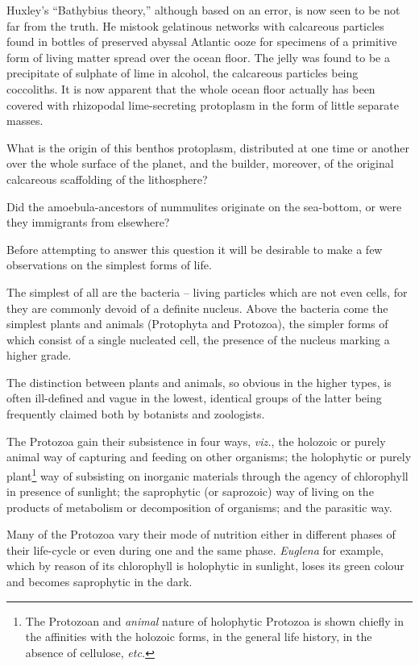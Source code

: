 \documentclass[a4paper, 12pt, oneside]{article}
\begin{document}
Huxley's ``Bathybius theory,'' although based on an error, is now seen to be not far from the truth. He mistook gelatinous networks with calcareous particles found in bottles of preserved abyssal Atlantic ooze for specimens of a primitive form of living matter spread over the ocean floor. The jelly was found to be a precipitate of sulphate of lime in alcohol, the calcareous particles being coccoliths. It is now apparent that the whole ocean floor actually has been covered with rhizopodal lime-secreting protoplasm in the form of little separate masses.

What is the origin of this benthos protoplasm, distributed at one time or another over the whole surface of the planet, and the builder, moreover, of the original calcareous scaffolding of the lithosphere?

Did the amoebula-ancestors of nummulites originate on the sea-bottom, or were they immigrants from elsewhere?

Before attempting to answer this question it will be desirable to make a few observations on the simplest forms of life.

The simplest of all are the bacteria -- living particles which are not even cells, for they are commonly devoid of a definite nucleus. Above the bacteria come the simplest plants and animals (Protophyta and Protozoa), the simpler forms of which consist of a single nucleated cell, the presence of the nucleus marking a higher grade.

The distinction between plants and animals, so obvious in the higher types, is often ill-defined and vague in the lowest, identical groups of the latter being frequently claimed both by botanists and zoologists.

The Protozoa gain their subsistence in four ways, \emph{viz.}, the holozoic or purely animal way of capturing and feeding on other organisms; the holophytic or purely plant\footnote{The Protozoan and \emph{animal} nature of holophytic Protozoa is shown chiefly in the affinities with the holozoic forms, in the general life history, in the absence of cellulose, \emph{etc.}} way of subsisting on inorganic materials through the agency of chlorophyll in presence of sunlight; the saprophytic (or saprozoic) way of living on the products of metabolism or decomposition of organisms; and the parasitic way.

Many of the Protozoa vary their mode of nutrition either in different phases of their life-cycle or even during one and the same phase. \emph{Euglena} for example, which by reason of its chlorophyll is holophytic in sunlight, loses its green colour and becomes saprophytic in the dark.
\end{document}

